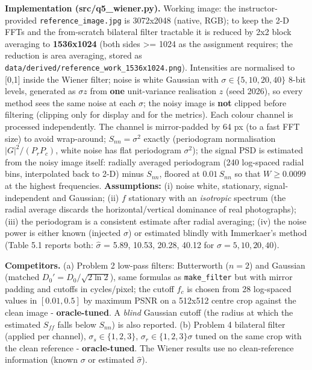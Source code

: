\documentclass[10pt,a4paper]{article}
\begin{document}
\textbf{Implementation (src/q5\_wiener.py).} Working image: the instructor-provided \texttt{reference\_\allowbreak{}image.\allowbreak{}jpg} is 3072x2048 (native, RGB); to keep the 2-D FFTs and the from-scratch bilateral filter tractable it is reduced by 2x2 block averaging to \textbf{1536x1024} (both sides \textgreater{}= 1024 as the assignment requires; the reduction is area averaging, stored as \texttt{data/\allowbreak{}derived/\allowbreak{}reference\_\allowbreak{}work\_\allowbreak{}1536x1024.\allowbreak{}png}). Intensities are normalised to [0,1] inside the Wiener filter; noise is white Gaussian with $\sigma\in\{5,10,20,40\}$ 8-bit levels, generated as $\sigma z$ from \textbf{one} unit-variance realisation $z$ (seed 2026), so every method sees the same noise at each $\sigma$; the noisy image is \textbf{not} clipped before filtering (clipping only for display and for the metrics). Each colour channel is processed independently. The channel is mirror-padded by 64 px (to a fast FFT size) to avoid wrap-around; $S_{nn}=\sigma^2$ exactly (periodogram normalisation $|G|^2/(P_rP_c)$, white noise has flat periodogram $\sigma^2$); the signal PSD is estimated from the noisy image itself: radially averaged periodogram (240 log-spaced radial bins, interpolated back to 2-D) minus $S_{nn}$, floored at $0.01\,S_{nn}$ so that $W\ge0.0099$ at the highest frequencies. \textbf{Assumptions:} (i) noise white, stationary, signal-independent and Gaussian; (ii) $f$ stationary with an \textit{isotropic} spectrum (the radial average discards the horizontal/vertical dominance of real photographs); (iii) the periodogram is a consistent estimate after radial averaging; (iv) the noise power is either known (injected $\sigma$) or estimated blindly with Immerkaer's method (Table 5.1 reports both: $\hat\sigma$ = 5.89, 10.53, 20.28, 40.12 for $\sigma=5,10,20,40$).

\textbf{Competitors.} (a) Problem 2 low-pass filters: Butterworth ($n=2$) and Gaussian (matched $D_0'=D_0/\sqrt{2\ln2}$), same formulas as \texttt{make\_\allowbreak{}filter} but with mirror padding and cutoffs in cycles/pixel; the cutoff $f_c$ is chosen from 28 log-spaced values in $[0.01,0.5]$ by maximum PSNR on a 512x512 centre crop against the clean image - \textbf{oracle-tuned}. A \textit{blind} Gaussian cutoff (the radius at which the estimated $S_{ff}$ falls below $S_{nn}$) is also reported. (b) Problem 4 bilateral filter (applied per channel), $\sigma_s\in\{1,2,3\}$, $\sigma_r\in\{1,2,3\}\sigma$ tuned on the same crop with the clean reference - \textbf{oracle-tuned}. The Wiener results use no clean-reference information (known $\sigma$ or estimated $\hat\sigma$).
\end{document}
